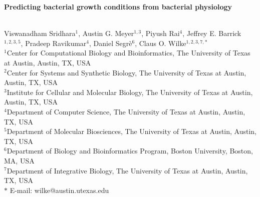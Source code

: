 \documentclass[12pt]{article}
\date{}
\begin{document}
\begin{flushleft}
{\Large
\textbf{Predicting bacterial growth conditions from bacterial physiology}
}

\bigskip
\noindent
\\
Viswanadham Sridhara$^{1}$,
Austin G. Meyer$^{1,3}$,
Piyush Rai$^{4}$,
Jeffrey E. Barrick$^{1,2,3,5}$,
Pradeep Ravikumar$^{4}$,
Daniel Segr\`e$^{6}$, 
Claus O. Wilke$^{1,2,3,7,\ast}$
\\
\bigskip
$^1$Center for Computational Biology and Bioinformatics, The University of Texas at Austin, Austin, TX, USA
\\
$^2$Center for Systems and Synthetic Biology, The University of Texas at Austin, Austin, TX, USA
\\
$^3$Institute for Cellular and Molecular Biology, The University of Texas at Austin, Austin, TX, USA
\\
$^4$Department of Computer Science, The University of Texas at Austin, Austin, TX, USA
\\
$^5$Department of Molecular Biosciences, The University of Texas at Austin, Austin, TX, USA
\\
$^6$Department of Biology and Bioinformatics Program, Boston University, Boston, MA, USA
\\
$^7$Department of Integrative Biology, The University of Texas at Austin, Austin, TX, USA
\\
\bigskip
$\ast$ E-mail: wilke@austin.utexas.edu
\end{flushleft}
\end{document}
